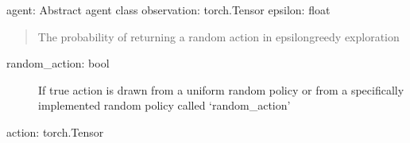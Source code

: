 \documentclass[letterpaper,10pt,english]{sphinxmanual}
\begin{document}
\begin{fulllineitems}
\label{\detokenize{MultiAgentMarketRL:environment.get_agent_actions}}
\sphinxAtStartPar
agent: Abstract agent class
observation: torch.Tensor
epsilon: float
\begin{quote}

\sphinxAtStartPar
The probability of returning a random action in epsilon\sphinxhyphen{}greedy exploration
\end{quote}
\begin{description}
\item[{random\_action: bool}] \leavevmode
\sphinxAtStartPar
If true action is drawn from a uniform random policy or from a specifically implemented random policy called
‘random\_action’

\end{description}

\sphinxAtStartPar
action: torch.Tensor

\end{fulllineitems}


\begin{fulllineitems}
\label{\detokenize{MultiAgentMarketRL:environment.get_basic_agent_info}}
\end{fulllineitems}

\label{\detokenize{MultiAgentMarketRL:module-markets}}
\end{document}
